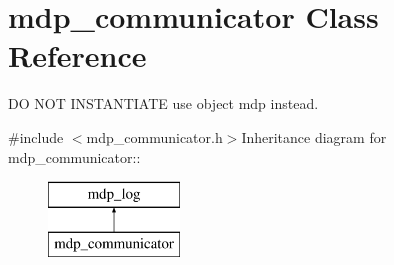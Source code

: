 \hypertarget{classmdp__communicator}{
\section{mdp\_\-communicator Class Reference}
\label{classmdp__communicator}
}


DO NOT INSTANTIATE use object mdp instead.  


{\ttfamily \#include $<$mdp\_\-communicator.h$>$}Inheritance diagram for mdp\_\-communicator::\begin{figure}[H]
\begin{center}
\leavevmode
\includegraphics[height=2cm]{classmdp__communicator}
\end{center}
\end{figure}

